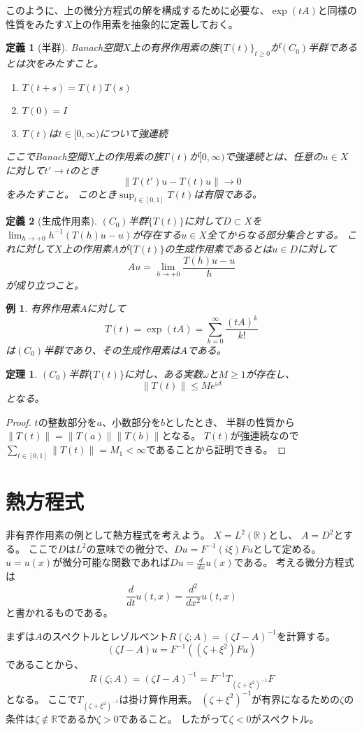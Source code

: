 \documentclass{jsarticle}
\newtheorem{dfn}{定義}
\newtheorem{eg}{例}
\newtheorem{thm}{定理}
\newcommand{\R}{\mathbb{R}}
\newcommand{\norm}[1]{\|#1\|}
\begin{document}
このように、上の微分方程式の解を構成するために必要な、$\exp(tA)$と同様の性質をみたす$X$上の作用素を抽象的に定義しておく。
\begin{dfn}[半群]
Banach空間$X$上の有界作用素の族$\{T(t)\}_{t\geq0}$が$(C_0)$半群であるとは次をみたすこと。
\begin{enumerate}
\item $T(t+s)=T(t)T(s)$
\item $T(0)=I$
\item $T(t)$は$t\in[0,\infty)$について強連続
\end{enumerate}
ここでBanach空間$X$上の作用素の族$T(t)$が$[0,\infty)$で強連続とは、任意の$u\in X$に対して$t'\to t$のとき
\[
\norm{T(t')u-T(t)u}\to 0
\]
をみたすこと。
このとき$\sup_{t\in[0,1]}T(t)$は有限である。
\end{dfn}

\begin{dfn}[生成作用素]
$(C_0)$半群$\{T(t)\}$に対して$D\subset X$を$\lim_{h\to+0}h^{-1}(T(h)u-u)$が存在する$u\in X$全てからなる部分集合とする。
これに対して$X$上の作用素$A$が$\{T(t)\}$の生成作用素であるとは$u\in D$に対して
\[
Au=\lim_{h\to+0}\frac{T(h)u-u}{h}
\]
が成り立つこと。
\end{dfn}
\begin{eg}
有界作用素$A$に対して
\[
T(t)=\exp(tA)=\sum^\infty_{k=0}\frac{(tA)^k}{k!}
\]
は$(C_0)$半群であり、その生成作用素は$A$である。
\end{eg}

\begin{thm}
$(C_0)$半群$\{T(t)\}$に対し、ある実数$\omega$と$M\geq1$が存在し、
\[
\norm{T(t)}\leq Me^{\omega t}
\]
となる。
\end{thm}
\begin{proof}
$t$の整数部分を$a$、小数部分を$b$としたとき、
半群の性質から$\norm{T(t)}=\norm{T(a)}\norm{T(b)}$となる。
$T(t)$が強連続なので$\sum_{t\in[0,1]}\norm{T(t)}=M_1<\infty$であることから証明できる。
\end{proof}

\section{熱方程式}
非有界作用素の例として熱方程式を考えよう。
$X=L^2(\R)$とし、 $A=D^2$とする。
ここで$D$は$L^2$の意味での微分で、$Du=F^{-1}(i\xi)Fu$として定める。
$u=u(x)$が微分可能な関数であれば$Du=\frac{d}{dx}u(x)$である。
考える微分方程式は
\[
\frac{d}{dt}u(t,x)=\frac{d^2}{dx^2}u(t,x)
\]
と書かれるものである。

まずは$A$のスペクトルとレゾルベント$R(\zeta;A)=(\zeta I-A)^{-1}$を計算する。
\[
(\zeta I-A)u=F^{-1}((\zeta+\xi^2)Fu)
\]
であることから、
\[
R(\zeta;A)=(\zeta I-A)^{-1}=F^{-1}T_{(\zeta+\xi^2)^{-1}}F
\]
となる。
ここで$T_{(\zeta+\xi^2)^{-1}}$は掛け算作用素。
$(\zeta+\xi^2)^{-1}$が有界になるための$\zeta$の条件は$\zeta\not\in\R$であるか$\zeta>0$であること。
したがって$\zeta<0$がスペクトル。
\end{document}
